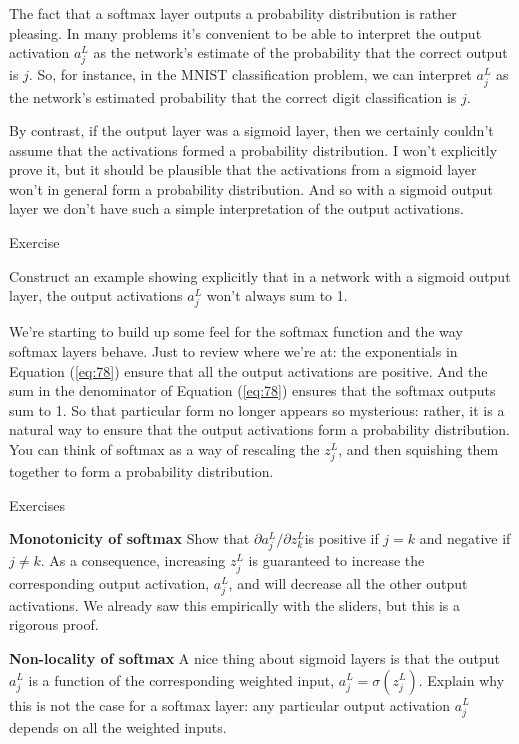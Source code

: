 \documentclass[a4paper,twoside,10pt]{book}
\begin{document}
The fact that a softmax layer outputs a probability distribution is rather pleasing. In many problems it's convenient to be able to interpret the output activation $a^L_j$ as the network's estimate of the probability that the correct output is $j$. So, for instance, in the MNIST classification problem, we can interpret $a^L_j$ as the network's estimated probability that the correct digit classification is $j$.

By contrast, if the output layer was a sigmoid layer, then we certainly couldn't assume that the activations formed a probability distribution. I won't explicitly prove it, but it should be plausible that the activations from a sigmoid layer won't in general form a probability distribution. And so with a sigmoid output layer we don't have such a simple interpretation of the output activations.

\begin{exercize}{Exercise}
	\item Construct an example showing explicitly that in a network with a sigmoid output layer, the output activations $a^L_j$ won't always sum to 1.
\end{exercize}
We're starting to build up some feel for the softmax function and the way softmax layers behave. Just to review where we're at: the exponentials in Equation (\ref{eq:78}) ensure that all the output activations are positive. And the sum in the denominator of Equation (\ref{eq:78}) ensures that the softmax outputs sum to 1. So that particular form no longer appears so mysterious: rather, it is a natural way to ensure that the output activations form a probability distribution. You can think of softmax as a way of rescaling the $z^L_j$, and then squishing them together to form a probability distribution.


\begin{exercize}{Exercises}
\item \textbf{Monotonicity of softmax} Show that $\partial a^L_j / \partial z^L_k $is positive if $j=k$ and negative if $j\ne k$. As a consequence, increasing $z^L_j$ is guaranteed to increase the corresponding output activation, $a^L_j$, and will decrease all the other output activations. We already saw this empirically with the sliders, but this is a rigorous proof.
\item \textbf{Non-locality of softmax} A nice thing about sigmoid layers is that the output $a^L_j$ is a function of the corresponding weighted input, $a^L_j=\sigma(z^L_j)$. Explain why this is not the case for a softmax layer: any particular output activation $a^L_j$ depends on all the weighted inputs.
\end{exercize}
\end{document}
